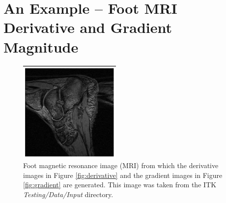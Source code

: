 \documentclass{InsightArticle}
\begin{document}
\section{An Example -- Foot MRI Derivative and Gradient Magnitude}

\begin{figure}
  \begin{center}
    \includegraphics[width=5cm]{Comparisons/foot.png}
  \end{center}
  \caption{Foot magnetic resonance image (MRI) from which the derivative images
  in Figure \ref{fig:derivative} and the gradient images in Figure \ref{fig:gradient} are
  generated.  This image was taken from the ITK \textit{Testing/Data/Input}
  directory.}
  \label{fig:intensity}
\end{figure}
\end{document}
